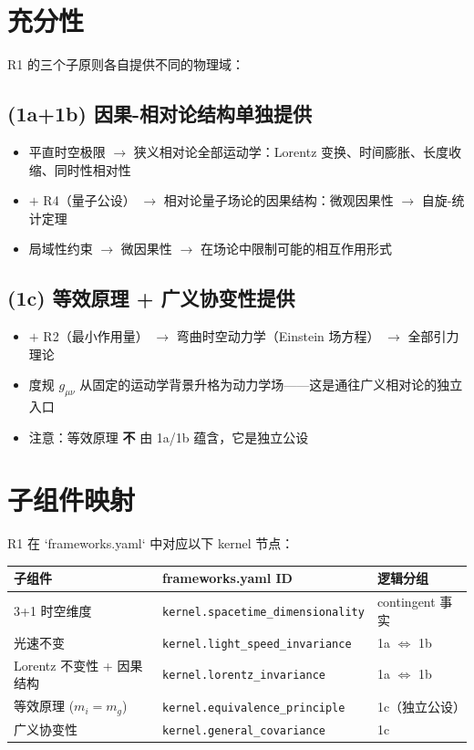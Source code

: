 \section{充分性}

R1 的三个子原则各自提供不同的物理域：

\subsection{(1a+1b) 因果-相对论结构单独提供}

\begin{itemize}
  \item 平直时空极限 $\to$ 狭义相对论全部运动学：Lorentz 变换、时间膨胀、长度收缩、同时性相对性
  \item $+$ R4（量子公设） $\to$ 相对论量子场论的因果结构：微观因果性 $\to$ 自旋-统计定理
  \item 局域性约束 $\to$ 微因果性 $\to$ 在场论中限制可能的相互作用形式
\end{itemize}

\subsection{(1c) 等效原理 + 广义协变性提供}

\begin{itemize}
  \item $+$ R2（最小作用量） $\to$ 弯曲时空动力学（Einstein 场方程） $\to$ 全部引力理论
  \item 度规 $g_{\mu\nu}$ 从固定的运动学背景升格为动力学场——这是通往广义相对论的独立入口
  \item 注意：等效原理 \textbf{不} 由 1a/1b 蕴含，它是独立公设
\end{itemize}

\section{子组件映射}

R1 在 `frameworks.yaml` 中对应以下 kernel 节点：

\begin{center}
\small
\begin{tabular}{p{3cm}p{5cm}p{4cm}}
\toprule
\textbf{子组件} & \textbf{frameworks.yaml ID} & \textbf{逻辑分组} \\
\midrule
3+1 时空维度 & \texttt{kernel.spacetime\_dimensionality} & contingent 事实 \\
光速不变 & \texttt{kernel.light\_speed\_invariance} & 1a $\iff$ 1b \\
Lorentz 不变性 + 因果结构 & \texttt{kernel.lorentz\_invariance} & 1a $\iff$ 1b \\
等效原理 ($m_i=m_g$) & \texttt{kernel.equivalence\_principle} & 1c（独立公设） \\
广义协变性 & \texttt{kernel.general\_covariance} & 1c \\
\bottomrule
\end{tabular}
\end{center}

